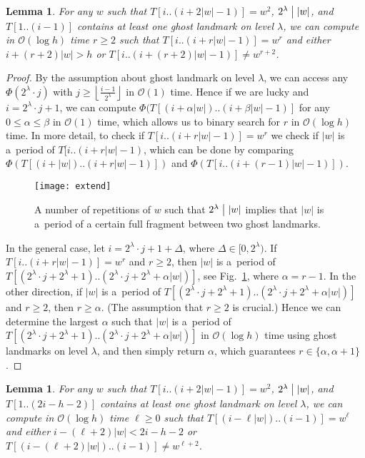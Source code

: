 \documentclass{article}[11pt,letter]
\newtheorem{lemma}[definition]{Lemma}
\newcommand{\bigo}{\mathcal{O}}
\newcommand{\head}{h}
\newcommand{\hash}{\Phi}
\newcommand{\divides}{\bigm|}
\newcommand{\bhash}{\hash}
\newcommand{\level}{\lambda}
\begin{document}
\begin{lemma}
For any $w$ such that $T[i..(i+2|w|-1)]=w^{2}$, $2^{\level} \divides |w|$, and $T[1..(i-1)]$ contains at least one ghost landmark on level
$\level$, we can compute in $\bigo(\log h)$ time $r \geq 2$
such that $T[i..(i+r |w|-1)]=w^{r}$ and either $i+(r+2) |w| > h$ or $T[i..(i+(r+2) |w|-1)] \neq w^{r+2}$.
\label{lemma:extend}
\end{lemma}

\begin{proof}
By the assumption about ghost landmark on level $\level$, we can access any $\bhash(2^{\level}\cdot j)$ with
$j\geq\left\lfloor \frac{i-1}{2^{\level}}\right\rfloor$ in $\bigo(1)$ time.
Hence if we are lucky and $i=2^{\level}\cdot j+1$, we can compute $\hash(T[(i+\alpha|w|)..(i+\beta|w|-1)]$ for any $0\leq\alpha\leq\beta$
in $\bigo(1)$ time, which allows us to binary search for $r$ in $\bigo(\log h)$ time. In more
detail, to check if $T[i..(i+r |w|-1)]=w^{r}$ we check if $|w|$ is a~period of $T[i..(i+r |w|-1)$,
which can be done by comparing $\hash(T[(i+|w|)..(i+r |w|-1)])$ and
$\hash(T[i..(i+(r-1)|w|-1)])$.

\begin{figure}[t]
\texttt{[image: extend]}
\caption{A number of repetitions of $w$ such that $2^{\level} \divides |w|$ implies that $|w|$ is a~period of a
certain full fragment between two ghost landmarks.} 
\label{fig:extend}
\end{figure}

In the general case, let $i = 2^{\level}\cdot j+1+\Delta$, where $\Delta\in [0,2^{\level})$.
If $T[i..(i+r |w|-1)]=w^{r}$ and $r\geq 2$, then $|w|$ is a~period of $T[(2^{\level}\cdot j+2^{\level}+1)..(2^{\level}\cdot j +2^{\level}+\alpha |w|)]$,
see Fig.~\ref{fig:extend}, where $\alpha= r-1$. In the other direction, if $|w|$ is a~period of
$T[(2^{\level}\cdot j+2^{\level}+1)..(2^{\level}\cdot j +2^{\level}+\alpha |w|)]$ and $r \geq 2$, then $r \geq \alpha$. (The assumption that
$r \geq 2$ is crucial.) Hence we can determine the largest $\alpha$ such that
$|w|$ is a~period of $T[(2^{\level}\cdot j+2^{\level}+1)..(2^{\level}\cdot j +2^{\level}+\alpha |w|)]$ in $\bigo(\log h)$ time using ghost landmarks
on level $\level$, and then simply return $\alpha$, which guarantees $r \in \{\alpha,\alpha+1\}$.
\end{proof}

\begin{lemma}
For any $w$ such that $T[i..(i+2|w|-1)]=w^{2}$, $2^{\level} \divides |w|$, and $T[1..(2i-\head-2)]$ contains at least one ghost landmark on level
$\level$, we can compute in $\bigo(\log h)$ time $\ell \geq 0$
such that $T[(i-\ell |w|)..(i-1)]=w^{\ell}$ and either $i-(\ell+2) |w|< 2i-h-2$ or $T[(i-(\ell+2) |w|)..(i-1)] \neq w^{\ell+2}$.
\label{lemma:extend2}
\end{lemma}
\end{document}

